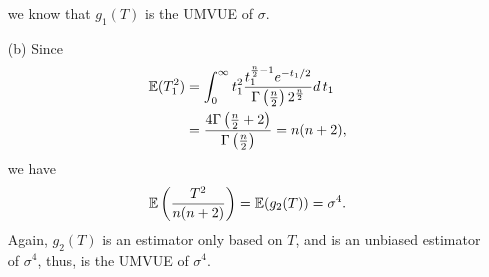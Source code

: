 \documentclass{article}
\begin{document}
\begin{CJK}{UTF8}{gbsn}
\begin{itemize}
              we know that $g_1(T)$ is the UMVUE of $\sigma$.
        \item [(b)]
              Since
              \begin{align}
                  {\mathbb E} (T_1^2) & = \int_0^{\infty} t_1^2 \frac{t_1^{\frac{n}{2} - 1}e^{-t_1/2}}{\Gamma \left (\frac{n}{2}\right )2^{\frac{n}{2}}} d \,t_1 \notag \\
                              & = \frac{4\Gamma \left (\frac{n}{2} + 2 \right )}{\Gamma\left (\frac{n}{2} \right )} = n(n+2), \notag
              \end{align}
              we have
              \begin{align}
                  {\mathbb E} \left (\frac{T^2}{n(n+2)} \right ) = {\mathbb E}(g_2(T)) = \sigma^4.\notag
              \end{align}
              Again, $g_2(T)$ is an estimator only based on $T$, and is an unbiased estimator of $\sigma^4$, thus, is the
              UMVUE of $\sigma^4$.
    \end{itemize}




\end{CJK}
\end{document}
